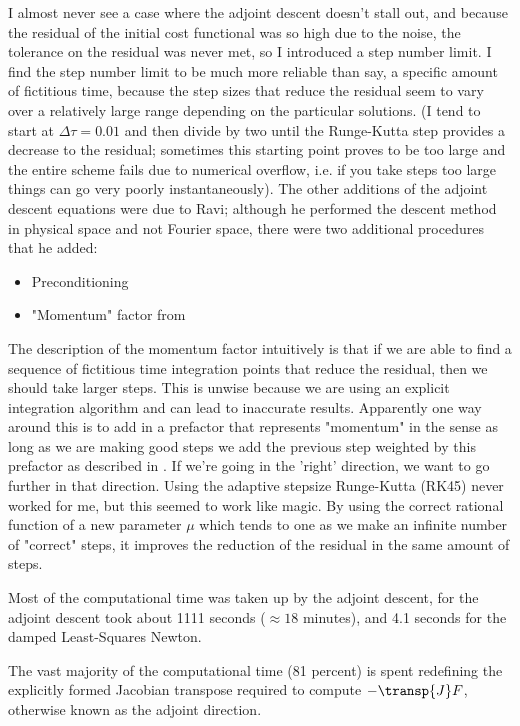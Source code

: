\begin{description}
{I almost never see a case where the adjoint descent doesn't stall out, and
because the residual of the initial cost functional was so high due to the
noise, the tolerance on the residual was never met, so I introduced a step
number limit. I find the step number limit to be much more reliable than say, a
specific amount of fictitious time, because the step sizes that reduce the
residual seem to vary over a relatively large range depending on the particular
solutions. (I tend to start at $\Delta \tau = 0.01$ and then divide by two
until the Runge-Kutta step provides a decrease to the residual; sometimes this
starting point proves to be too large and the entire scheme fails due to
numerical overflow, i.e. if you take steps too large things can go very poorly
instantaneously). The other additions of the adjoint descent equations were due
to Ravi; although he performed the descent method in physical space and not
Fourier space, there were two additional procedures that he added:

\begin{itemize}
\item Preconditioning
\item "Momentum" factor from 
\end{itemize}

The description of the momentum factor intuitively is that if we are able to find a sequence of fictitious time integration
points that reduce the residual, then we should take larger steps. This is unwise because we are using an explicit
integration algorithm and can
lead to inaccurate results. Apparently one way around this is to add in a prefactor that represents "momentum"
in the sense as long as we are making good steps we add the previous step weighted by this prefactor as described
in .
If we're going in the 'right' direction, we want to go further in that direction. Using the adaptive stepsize Runge-Kutta
(RK45) never worked for me, but this seemed to work like magic. By using the correct rational function of a new parameter $\mu$
which tends to one as we make an infinite number of "correct" steps, it improves the reduction of the residual in the same amount
of steps.

Most of the computational time was taken up by the adjoint descent, for  the adjoint descent
took about 1111 seconds ($\approx 18$ minutes), and 4.1 seconds for the damped Least-Squares Newton.

The vast majority of the computational time (81 percent) is spent redefining the explicitly formed
Jacobian transpose required to compute $-\transp{J} F$, otherwise known as the adjoint direction.

}
\end{description}
